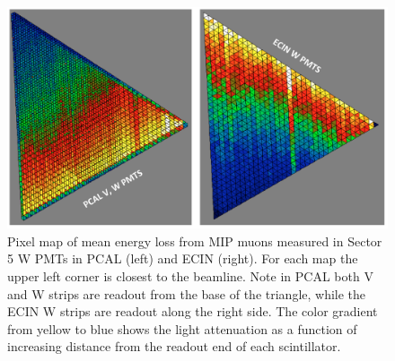 \begin{figure}[hbt]
\centering
\includegraphics[width=1.0\columnwidth,keepaspectratio]{img/S9_1_1.png}
\caption[]{Pixel map of mean energy loss from MIP muons measured in Sector 5 W PMTs in PCAL (left) and ECIN
  (right). For each map the upper left corner is closest to the beamline. Note in PCAL both V and W strips are readout
  from the base of the triangle, while the ECIN W strips are readout along the right side. The color gradient from
  yellow to blue shows the light attenuation as a function of increasing distance from the readout end of each scintillator.}
\label{fig:S9_1_1}
\end{figure}

